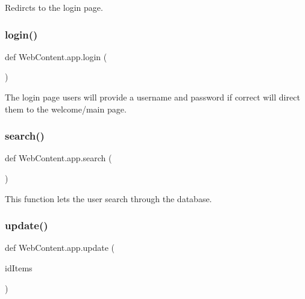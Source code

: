 \begin{DoxyVerb}Redircts to the login page.
\end{DoxyVerb}
 \mbox{\label{namespace_web_content_1_1app_a1e55cf68c2c2c883c82749a8725e068c}} 
\subsubsection{\texorpdfstring{login()}{login()}}
{\footnotesize\ttfamily def Web\+Content.\+app.\+login (\begin{DoxyParamCaption}{ }\end{DoxyParamCaption})}

\begin{DoxyVerb}The login page
users will provide a username and password if correct
will direct them to the welcome/main page.
\end{DoxyVerb}
 \mbox{\label{namespace_web_content_1_1app_a6d7ee2ff030bada6042b07189d92a01c}} 
\subsubsection{\texorpdfstring{search()}{search()}}
{\footnotesize\ttfamily def Web\+Content.\+app.\+search (\begin{DoxyParamCaption}{ }\end{DoxyParamCaption})}

\begin{DoxyVerb}This function lets the user search
through the database.
\end{DoxyVerb}
 \mbox{\label{namespace_web_content_1_1app_a2f6071690c83608f94abb72589ab7527}} 
\subsubsection{\texorpdfstring{update()}{update()}}
{\footnotesize\ttfamily def Web\+Content.\+app.\+update (\begin{DoxyParamCaption}\item[{}]{id\+Items }\end{DoxyParamCaption})}

